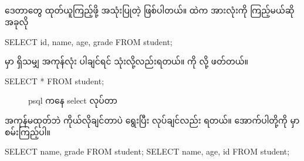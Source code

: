 \subsection*{}
 ဒေတာတွေ ထုတ်ယူကြည့်ဖို့ အသုံးပြုတဲ့  ဖြစ်ပါတယ်။  ထဲက  အားလုံးကို ကြည့်မယ်ဆို အခုလို 
%
\begin{sql}
SELECT id, name, age, grade FROM student;
\end{sql}
%
 မှာ ရှိသမျှ  အကုန်လုံး ပါချင်ရင်  သုံးလို့လည်းရတယ်။  ကို  လို့ ဖတ်တယ်။
%
\begin{sql}
SELECT * FROM student;
\end{sql}
%

\begin{figure}[tbh!]
\caption{psql ကနေ select လုပ်တာ} 
\label{fig:selectstu}
\end{figure}

 အကုန်မထုတ်ဘဲ ကိုယ်လိုချင်တာပဲ ရွေးပြီး  လုပ်ချင်လည်း ရတယ်။ အောက်ပါတို့ကို  မှာ စမ်းကြည့်ပါ။
%
\begin{sql}
SELECT name, grade FROM student;
SELECT name, age, id FROM student;
\end{sql}
%
